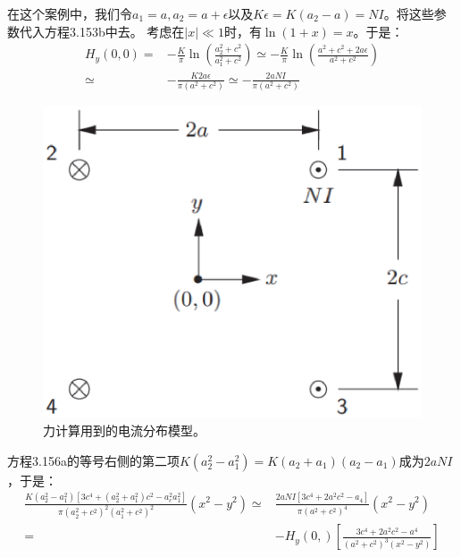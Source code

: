 在这个案例中，我们令$a_1=a,a_2=a+\epsilon$以及$K\epsilon=K(a_2-a)=NI$。将这些参数代入方程3.153b中去。
考虑在$|x|\ll 1$时，有$\ln(1+x)=x$。于是：
\begin{equation}
\begin{split}
H_{y}(0,0)=&-\frac{K}{\pi}\ln(\frac{a_{2}^{2}+c^{2}}{a_{1}^{2}+c^{2}})\simeq-\frac{K}{\pi}\ln(\frac{a^{2}+c^{2}+2a\epsilon}{a^{2}+c^{2}})\\
\simeq&-\frac{K2a\epsilon}{\pi(a^{2}+c^{2})}\simeq-\frac{2aNI}{\pi(a^{2}+c^{2})}%
\end{split}
\end{equation}

\begin{figure}[htbp]
	\centering
	\includegraphics[scale=0.5]{chpt3/figs/fig3.38.eps}
	\caption{力计算用到的电流分布模型。}
\end{figure}

方程3.156a的等号右侧的第二项$K(a_2^2−a^2_1)=K(a_2+a_1)(a_2−a_1)$成为$2aNI$，于是：
\begin{equation*}
\begin{split}
\frac{K(a_{2}^{2}-a_{1}^{2})[3c^{4}+(a_{2}^{2}+a_{1}^{2})c^{2}-a_{c}^{2}a_{1}^{2}]}{\pi(a_{2}^{2}+c^{2})^{2}(a_{1}^{2}+c^{2})^{2}}(x^{2}-y^{2})\simeq&\frac{2aNI[3c^{4}+2a^{2}c^{2}-a_{4}]}{\pi(a^{2}+c^{2})^{4}}(x^{2}-y^{2})\\
=&-H_{y}(0,)[\frac{3c^{4}+2a^{2}c^{2}-a^{4}}{(a^{2}+c^{2})^{3}(x^{2}-y^{2})}]
\end{split}
\end{equation*}

